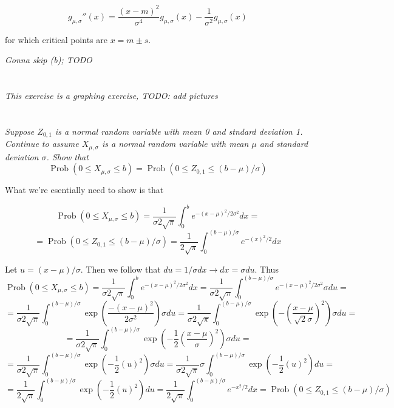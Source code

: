 \documentclass[11pt,oneside,titlepage]{book}
\DeclareMathOperator \prob {\text{Prob}}
\begin{document}
$$g_{\mu, \sigma}''(x) = \frac{(x - m)^2}{\sigma^4}g_{\mu, \sigma}(x) - \frac{1}{\sigma^2}g_{\mu, \sigma}(x)$$

for which critical points are $x = m \pm s$.

\textit{Gonna skip (b); TODO }

\section{}

\textit{This exercise is a graphing exercise, TODO: add pictures}

\section{}

\textit{Suppose $Z_{0, 1}$ is a normal random variable with mean 0 and stndard deviation 1.
  Continue to assume $X_{\mu, \sigma}$ is a normal random variable with mean $\mu$ and
  standard deviation $\sigma$. Show that }
$$\prob(0 \leq X_{\mu, \sigma} \leq b) = \prob(0 \leq Z_{0, 1} \leq (b - \mu) / \sigma)$$

What we're esentially need to show is that 

$$ \prob(0 \leq X_{\mu, \sigma} \leq b) = \frac{1}{\sigma 2 \sqrt{\pi}}\int_0^b{e^{-(x - \mu)^2/2\sigma^2} dx} = $$
$$ = 
\prob(0 \leq Z_{0, 1} \leq (b - \mu) / \sigma) = \frac{1}{2 \sqrt{\pi}} \int_0^{(b - \mu)/\sigma}{e^{-(x)^2/2} dx}$$

Let $u = (x - \mu)/\sigma$. Then we follow that $du = 1/\sigma dx \to dx = \sigma du$. Thus
$$ \prob(0 \leq X_{\mu, \sigma} \leq b) =
\frac{1}{\sigma 2 \sqrt{\pi}} \int_0^b{e^{-(x - \mu)^2/2\sigma^2} dx} =
\frac{1}{\sigma 2 \sqrt{\pi}} \int_0^{(b - \mu)/\sigma}{e^{-(x - \mu)^2/2\sigma^2} \sigma du} =
$$
$$ = 
\frac{1}{\sigma 2 \sqrt{\pi}} \int_0^{(b - \mu)/\sigma}{\exp{(\frac{-(x - \mu)^2}{2\sigma^2})}
  \sigma du} = \frac{1}{\sigma 2 \sqrt{\pi}}
\int_0^{(b - \mu)/\sigma}{\exp{(- (\frac{x - \mu}{\sqrt{2}\sigma})^2)} \sigma du} =
$$
$$ = 
\frac{1}{\sigma 2 \sqrt{\pi}}
\int_0^{(b - \mu)/\sigma}{\exp{(- \frac{1}{2} (\frac{x - \mu}{\sigma})^2)} \sigma  du} =
$$
$$ = 
\frac{1}{\sigma 2 \sqrt{\pi}}
\int_0^{(b - \mu)/\sigma}{\exp{(- \frac{1}{2} (u)^2)} \sigma  du} =
\frac{1}{\sigma 2 \sqrt{\pi}}
\sigma \int_0^{(b - \mu)/\sigma}{\exp{(- \frac{1}{2} (u)^2)}  du} =
$$
$$ = 
\frac{1}{ 2 \sqrt{\pi}}
\int_0^{(b - \mu)/\sigma}{\exp{(- \frac{1}{2} (u)^2)}  du} =
\frac{1}{ 2 \sqrt{\pi}} \int_0^{(b - \mu)/\sigma}{e^{-x^2/2}  dx} =
\prob{(0 \leq Z_{0, 1} \leq (b - \mu)/\sigma)}
$$
\end{document}
